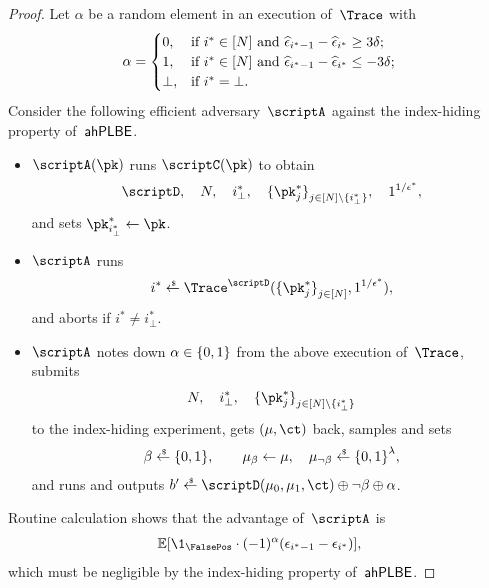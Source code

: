 \begin{proof}
Let $\alpha$ be a random element in an execution of~$\Trace$ with
\begin{align*}
\alpha=\begin{cases}
0,&\textup{if }i^\ast\in[N]\textup{ and }
\widehat{\epsilon}_{i^\ast-1}-\widehat{\epsilon}_{i^\ast}\geq 3\delta;\\
1,&\textup{if }i^\ast\in[N]\textup{ and }
\widehat{\epsilon}_{i^\ast-1}-\widehat{\epsilon}_{i^\ast}\leq -3\delta;\\
\bot,&\textup{if }i^\ast=\bot.
\end{cases}
\end{align*}
Consider the following efficient adversary~$\scriptA$ against the index-hiding property of~$\AHPLBE$.
\begin{itemize}
\item $\scriptA(\pk)$ runs $\scriptC(\pk)$ to obtain
\begin{align*}
\scriptD,\quad
N,\quad
i_\bot^\ast,\quad
\{\pk^\ast_j\}_{j\in{[N]\setminus{\{i_\bot^\ast\}}}}^\sphantom,\quad
1^{1/\epsilon^\ast},
\end{align*}
and sets ${\pk^\ast_{i_\bot^\ast}\gets\pk}$.
\item $\scriptA$ runs
\begin{align*}
i^\ast\draws\Trace^\scriptD(\{\pk^\ast_j\}_{j\in[N]}^\sphantom,1^{1/\epsilon^\ast}),
\end{align*}
and aborts if ${i^\ast\neq i_\bot^\ast}$.
\item $\scriptA$ notes down ${\alpha\in{\{0,1\}}}$ from the above execution of~$\Trace$,
submits
\begin{align*}
N,\quad
i_\bot^\ast,\quad
\{\pk^\ast_j\}_{j\in[N]\setminus\{i_\bot^\ast\}}^\sphantom
\end{align*}
to the index-hiding experiment,
gets $(\mu,\ct)$ back,
samples and sets
\begin{align*}
\beta\draws\bit,\qquad
\mu_\beta\gets\mu,\quad
\mu_{\neg\beta}\draws\bit^\lambda,
\end{align*}
and runs and outputs
${b'\draws\scriptD(\mu_0,\mu_1,\ct)\oplus\neg\beta\oplus\alpha}$.
\end{itemize}
Routine calculation shows that the advantage of~$\scriptA$ is
\begin{align*}
\EX[\1_\FalsePos\cdot(-1)^\alpha(\epsilon_{i^\ast-1}-\epsilon_{i^\ast})],
\end{align*}
which must be negligible by the index-hiding property of~$\AHPLBE$.


\end{proof}
